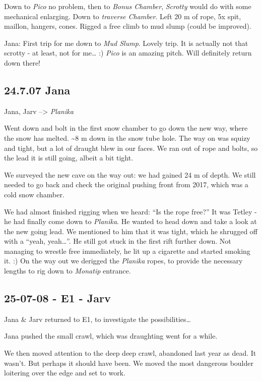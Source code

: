 Down to \emph{Pico} no problem, then to \emph{Bonus Chamber},
\emph{Scrotty} would do with some mechanical enlarging. Down to
\emph{traverse Chamber}. Left 20 m of rope, 5x spit, maillon, hangers,
cones. Rigged a free climb to mud slump (could be improved).

Jana: First trip for me down to \emph{Mud Slump}. Lovely trip. It is
actually not that scrotty - at least, not for me\ldots{} :) \emph{Pico}
is an amazing pitch. Will definitely return down there!

\hypertarget{jana}{%
\subsection{24.7.07 Jana}\label{jana}}

Jana, Jarv --\textgreater{} \emph{Planika}

Went down and bolt in the first snow chamber to go down the new way,
where the snow has melted. \textasciitilde 8 m down in the snow tube
hole. The way on was squizy and tight, but a lot of draught blew in our
faces. We ran out of rope and bolts, so the lead it is still going,
albeit a bit tight.

We surveyed the new cave on the way out: we had gained 24 m of depth. We
still needed to go back and check the original pushing front from 2017,
which was a cold snow chamber.

We had almost finished rigging when we heard: ``Is the rope free?'' It
was Tetley - he had finally come down to \emph{Planika}. He wanted to
head down and take a look at the new going lead. We mentioned to him
that it was tight, which he shrugged off with a ``yeah, yeah\ldots{}''.
He still got stuck in the first rift further down. Not managing to
wrestle free immediately, he lit up a cigarette and started smoking it.
:) On the way out we derigged the \emph{Planika} ropes, to provide the
necessary lengths to rig down to \emph{Monatip} entrance.


\hypertarget{e1---jarv}{%
\subsection{25-07-08 - E1 - Jarv}\label{e1---jarv}}

Jana \& Jarv returned to E1, to investigate the possibilities\ldots{}

Jana pushed the small crawl, which was draughting went for a while.

We then moved attention to the deep deep crawl, abandoned last year as
dead. It wasn't. But perhaps it should have been. We moved the most
dangerous boulder loitering over the edge and set to work.

